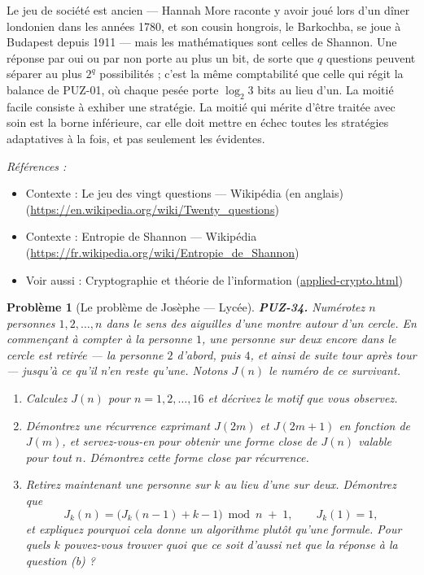 \documentclass[11pt]{article}
\newtheorem{problem}{Problème}
\newenvironment{refs}{\par\small\noindent\emph{Références :}\begin{itemize}\setlength\itemsep{0pt}}{\end{itemize}\normalsize}
\begin{document}
\noindent Le jeu de société est ancien --- Hannah More raconte y avoir joué lors
d'un dîner londonien dans les années 1780, et son cousin hongrois, le Barkochba, se joue à
Budapest depuis 1911 --- mais les mathématiques sont celles de Shannon. Une réponse par oui
ou par non porte au plus un bit, de sorte que $ q $ questions peuvent séparer au plus
$ 2^{q} $ possibilités ; c'est la même comptabilité que celle qui régit la balance de
PUZ-01, où chaque pesée porte $ \log_2 3 $ bits au lieu d'un. La moitié facile consiste à
exhiber une stratégie. La moitié qui mérite d'être traitée avec soin est la borne
inférieure, car elle doit mettre en échec toutes les stratégies adaptatives à la fois, et
pas seulement les évidentes.

\begin{refs}
\item Contexte : Le jeu des vingt questions --- Wikipédia (en anglais) (\url{https://en.wikipedia.org/wiki/Twenty_questions})
\item Contexte : Entropie de Shannon --- Wikipédia (\url{https://fr.wikipedia.org/wiki/Entropie_de_Shannon})
\item Voir aussi : Cryptographie et théorie de l'information (\url{applied-crypto.html})
\end{refs}

\bigskip

\begin{problem}[{Le problème de Josèphe --- Lycée}]
\textbf{PUZ-34.} Numérotez $ n $ personnes $ 1, 2, \ldots, n $ dans le sens des
aiguilles d'une montre autour d'un cercle. En commençant à compter à la personne $ 1 $,
une personne sur deux encore dans le cercle est retirée --- la personne $ 2 $ d'abord,
puis $ 4 $, et ainsi de suite tour après tour --- jusqu'à ce qu'il n'en reste qu'une.
Notons $ J(n) $ le numéro de ce survivant.
\begin{enumerate}
\item[(a)] Calculez $ J(n) $ pour $ n = 1, 2, \ldots, 16 $ et décrivez le motif que vous
observez.
\item[(b)] Démontrez une récurrence exprimant $ J(2m) $ et $ J(2m+1) $ en fonction de
$ J(m) $, et servez-vous-en pour obtenir une forme close de $ J(n) $ valable pour tout
$ n $. Démontrez cette forme close par récurrence.
\item[(c)] Retirez maintenant une personne sur $ k $ au lieu d'une sur deux. Démontrez que
\[ J_k(n) = \big( J_k(n-1) + k - 1 \big) \bmod n \; + \; 1, \qquad J_k(1) = 1, \]
et expliquez pourquoi cela donne un algorithme plutôt qu'une formule. Pour quels $ k $
pouvez-vous trouver quoi que ce soit d'aussi net que la réponse à la question (b) ?
\end{enumerate}

\end{problem}
\end{document}
